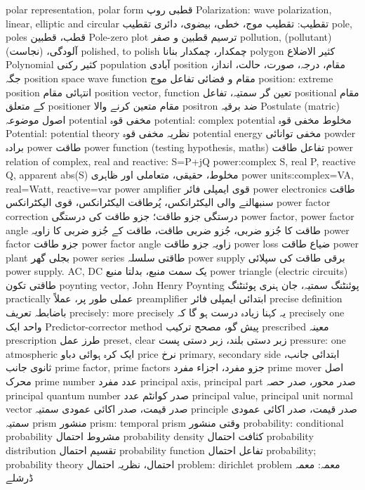 polar representation, polar form	قطبی روپ
Polarization: wave polarization, linear, elliptic and circular	تقطیب: تقطیب موج، خطی، بیضوی، دائری تقطیب
pole, poles	قطب، قطبین
Pole-zero plot	ترسیم قطبین و صفر
pollution, (pollutant)	آلودگی، (نجاست)
polished, to polish	چمکدار، چمکدار بنانا
polygon	کثیر الاضلاع
Polynomial	کثیر رکنی
population	آبادی
position	مقام، درجہ، صورت، حالت، انداز، جگہ
position space wave function	مقام و فضائی تفاعل موج
position: extreme position	انتہائی مقام
position vector, function	تعین گر سمتیہ، تفاعل
positional	مقام کے متعلق
positioner	مقام  متعین کرنے والا
positron	ضد برقیہ
Postulate (matric)	اصول موضوعہ
potential	مخفی قوہ
potential: complex potential	مخلوط مخفی قوہ
Potential: potential theory	نظریہ مخفی قوہ
potential energy	مخفی توانائی
powder	برادہ
power	طاقت
power function (testing hypothesis, maths)	تفاعل طاقت
power relation of complex, real and reactive: S=P+jQ	
power:complex S, real P, reactive Q, apparent abs(S)	مخلوط، حقیقی، متعاملی اور ظاہری
power units:complex=VA, real=Watt, reactive=var	
power amplifier	قوی ایمپلی فائر
power electronics	طاقت سنبھالنے والی الیکٹرانکس،  پُرطاقت الیکٹرانکس، قوی الیکٹرانکس
power factor correction	درستگی جزو طاقت؛ جزو طاقت کی درستگی
power factor, power factor angle	طاقت کا جُزو ضربی، جُزو ضربی طاقت، طاقت کے جُزو ضربی کا زاویہ
power factor	جزو طاقت
power factor angle	زاویہ جزو طاقت
power loss	ضیاع طاقت
power plant	بجلی گھر
power series	طاقتی سلسلہ
power supply	برقی طاقت کی سپلائی
power supply. AC, DC	یک سمت منبع، بدلتا منبع
power triangle (electric circuits)	طاقتی تکون
poynting vector, John Henry Poynting	پوئنٹنگ سمتیہ، جان ہنری پوئنٹنگ
practically	عملی طور پر، عملاً
preamplifier	ابتدائی ایمپلی فائر
precise definition	باضابطہ تعریف
precisely: more precisely	یہ کہنا زیادہ درست ہو گا کہ
precisely one	واحد ایک
Predictor-corrector method	پیش گو، مصحح ترکیب
prescribed	معینہ
prescription	طرز عمل
preset, clear	زبر دستی بلند، زبر دستی پست
pressure: one atmospheric	ایک کرہ ہوائی دباو
price	نرخ
primary, secondary side	ابتدائی جانب، ثانوی جانب
prime factor, prime factors	جزو مفرد، اجزاء مفرد
prime mover	اصل محرک
prime number	عدد مفرد
principal axis, principal part	صدر محور، صدر حصہ
principal quantum number	صدر کوانٹم عدد
principal value, principal unit normal vector	صدر قیمت، صدر اکائی عمودی سمتیہ
principle	صدر قیمت، صدر اکائی عمودی سمتیہ
prism	منشور
prism: temporal prism	وقتی منشور
probability: conditional probability	مشروط احتمال
probability density	کثافت احتمال
probability distribution	تقسیم احتمال
probability function	تفاعل احتمال
probability; probability theory	احتمال، نظریہ احتمال
problem: dirichlet problem	معمہ: معمہ ڈرشلے
